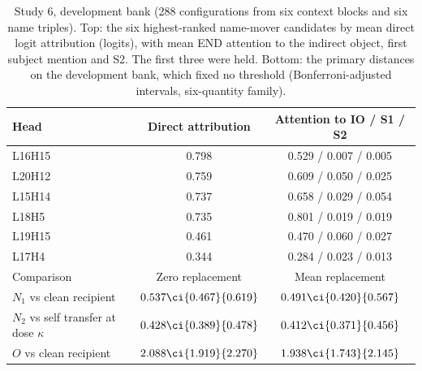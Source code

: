 \begin{table}[htbp]
\centering\small
\caption{Study 6, development bank (288 configurations from six context blocks and six name triples). Top: the six highest-ranked name-mover candidates by mean direct logit attribution (logits), with mean END attention to the indirect object, first subject mention and S2. The first three were held. Bottom: the primary distances on the development bank, which fixed no threshold (Bonferroni-adjusted intervals, six-quantity family).}
\label{tab:positive-control-development}
\footnotesize\setlength{\tabcolsep}{4pt}
\begin{tabular}{@{}lcc@{}}
\toprule
Head & Direct attribution & Attention to IO / S1 / S2 \\
\midrule
L16H15 & 0.798 & 0.529 / 0.007 / 0.005 \\
L20H12 & 0.759 & 0.609 / 0.050 / 0.025 \\
L15H14 & 0.737 & 0.658 / 0.029 / 0.054 \\
L18H5 & 0.735 & 0.801 / 0.019 / 0.019 \\
L19H15 & 0.461 & 0.470 / 0.060 / 0.027 \\
L17H4 & 0.344 & 0.284 / 0.023 / 0.013 \\
\midrule
Comparison & Zero replacement & Mean replacement \\
\midrule
$N_1$ vs clean recipient & $0.537\ci{0.467}{0.619}$ & $0.491\ci{0.420}{0.567}$ \\
$N_2$ vs self transfer at dose $\kappa$ & $0.428\ci{0.389}{0.478}$ & $0.412\ci{0.371}{0.456}$ \\
$O$ vs clean recipient & $2.088\ci{1.919}{2.270}$ & $1.938\ci{1.743}{2.145}$ \\
\bottomrule
\end{tabular}
\end{table}

